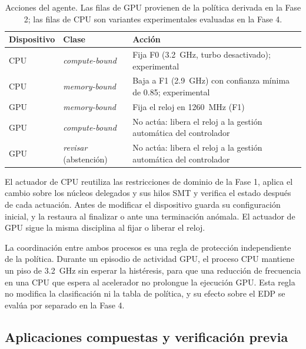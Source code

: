 \begin{table}[h!]
\centering
\caption[Acciones del agente]{Acciones del agente. Las filas de GPU provienen de la política derivada en la Fase 2; las filas de CPU son variantes experimentales evaluadas en la Fase 4.}
\label{tab:agente-politica}
\small
\setlength{\tabcolsep}{4pt}
\begin{tabular}{@{}>{\raggedright\arraybackslash}p{2.3cm}>{\raggedright\arraybackslash}p{3.0cm}>{\raggedright\arraybackslash}p{7.0cm}@{}}
\toprule
\textbf{Dispositivo} & \textbf{Clase} & \textbf{Acción} \\
\midrule
CPU & \textit{compute-bound} & Fija F0 (3.2~GHz, turbo desactivado); experimental \\
CPU & \textit{memory-bound} & Baja a F1 (2.9~GHz) con confianza mínima de 0.85; experimental \\
GPU & \textit{memory-bound} & Fija el reloj en 1260~MHz (F1) \\
GPU & \textit{compute-bound} & No actúa: libera el reloj a la gestión automática del controlador \\
GPU & \textit{revisar} (abstención) & No actúa: libera el reloj a la gestión automática del controlador \\
\bottomrule
\end{tabular}
\end{table}

El actuador de CPU reutiliza las restricciones de dominio de la Fase 1, aplica el cambio sobre los núcleos delegados y sus hilos SMT y verifica el estado después de cada actuación. Antes de modificar el dispositivo guarda su configuración inicial, y la restaura al finalizar o ante una terminación anómala. El actuador de GPU sigue la misma disciplina al fijar o liberar el reloj.

La coordinación entre ambos procesos es una regla de protección independiente de la política. Durante un episodio de actividad GPU, el proceso CPU mantiene un piso de 3.2~GHz sin esperar la histéresis, para que una reducción de frecuencia en una CPU que espera al acelerador no prolongue la ejecución GPU. Esta regla no modifica la clasificación ni la tabla de política, y su efecto sobre el EDP se evalúa por separado en la Fase 4.

\subsection{Aplicaciones compuestas y verificación previa}
\label{sec:metodologia-agente-compuestas}

